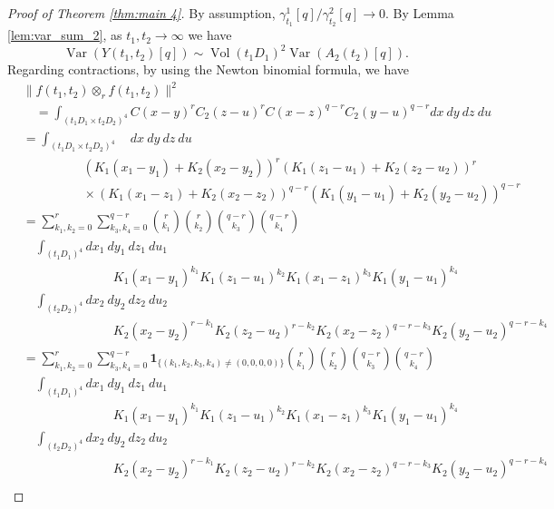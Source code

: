 \documentclass[12pt]{article}
\DeclareMathOperator{\var}{Var}
\DeclareMathOperator{\1}{1}
\DeclareMathOperator{\vol}{Vol}
\theoremstyle{plain}
\theoremstyle{definition}
\begin{document}
\begin{proof}[Proof of Theorem \ref{thm:main 4}]
By assumption, $\gamma^1_{t_1}[q]/\gamma_{t_2}^2[q]\rightarrow 0$. By Lemma \ref{lem:var_sum_2}, as $t_1,t_2\rightarrow\infty$ we have
\[
\var(Y(t_1,t_2)[q])\sim \vol(t_1D_1)^2\var(A_2(t_2)[q]).
\]
Regarding contractions, by using the Newton binomial formula, we have 
\begin{align}
&\|f(t_1,t_2)\otimes_r f(t_1,t_2) \|^2\\
&\quad =\int_{(t_1D_1 \times t_2D_2)^4}  C(x-y)^rC_2(z-u)^rC(x-z)^{q-r}C_2(y-u)^{q-r}dx \ dy \ dz \ du \\
         &=\int_{(t_1D_1 \times t_2D_2)^4}  \quad  dx \ dy \ dz \ du \\
         &\hspace{2cm}   (K_1(x_1-y_1)+K_2(x_2-y_2))^r(K_1(z_1-u_1)+K_2(z_2-u_2))^r\\
         &\hspace{2cm}  \times (K_1(x_1-z_1)+K_2(x_2-z_2))^{q-r}(K_1(y_1-u_1)+K_2(y_2-u_2))^{q-r}
         \\
&=\sum_{k_1,k_2=0}^r\sum_{k_3,k_4=0}^{q-r}\binom{r}{k_1}\binom{r}{k_2}\binom{q-r}{k_3}\binom{q-r}{k_4} \\
         &\quad \int_{(t_1D_1)^4} dx_1 \ dy_1 \ dz_1 \ du_1\\
         &\hspace{3cm} K_1(x_1-y_1)^{k_1} K_1(z_1-u_1)^{k_2}K_1(x_1-z_1)^{k_3} K_1(y_1-u_1)^{k_4} \\
         &\quad \int_{(t_2D_2)^4} dx_2 \ dy_2 \ dz_2 \ du_2 \\
         & \hspace{3cm} K_2(x_2-y_2)^{r-k_1} K_2(z_2-u_2)^{r-k_2}K_2(x_2-z_2)^{q-r-k_3} K_2(y_2-u_2)^{q-r-k_4}\\
&=\sum_{k_1,k_2=0}^r\sum_{k_3,k_4=0}^{q-r}\mathbf{1}_{\{(k_1,k_2,k_3,k_4)\neq(0,0,0,0)\}}\binom{r}{k_1}\binom{r}{k_2}\binom{q-r}{k_3}\binom{q-r}{k_4} \\
         &\quad \int_{(t_1D_1)^4} dx_1 \ dy_1 \ dz_1 \ du_1 \\
         & \hspace{3cm} K_1(x_1-y_1)^{k_1} K_1(z_1-u_1)^{k_2}K_1(x_1-z_1)^{k_3} K_1(y_1-u_1)^{k_4} \\
         &\quad \int_{(t_2D_2)^4}  dx_2 \ dy_2 \ dz_2 \ du_2 \\
         & \hspace{3cm} K_2(x_2-y_2)^{r-k_1} K_2(z_2-u_2)^{r-k_2}K_2(x_2-z_2)^{q-r-k_3} K_2(y_2-u_2)^{q-r-k_4}\\

\end{align}
\end{proof}
\end{document}
